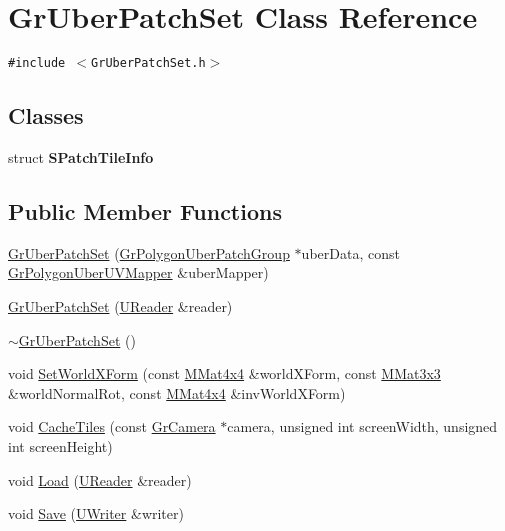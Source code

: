 \hypertarget{class_gr_uber_patch_set}{
\section{GrUberPatchSet Class Reference}
\label{class_gr_uber_patch_set}
}
{\tt \#include $<$GrUberPatchSet.h$>$}

\subsection*{Classes}
\begin{CompactItemize}
\item 
struct \textbf{SPatchTileInfo}
\end{CompactItemize}
\subsection*{Public Member Functions}
\begin{CompactItemize}
\item 
\hyperlink{class_gr_uber_patch_set_68d0f34222103250196fac2f52b8f4d6}{GrUberPatchSet} (\hyperlink{class_gr_polygon_uber_patch_group}{GrPolygonUberPatchGroup} $\ast$uberData, const \hyperlink{class_gr_polygon_uber_u_v_mapper}{GrPolygonUberUVMapper} \&uberMapper)
\item 
\hyperlink{class_gr_uber_patch_set_de170763792a014a4ec60906e5a559cc}{GrUberPatchSet} (\hyperlink{class_u_reader}{UReader} \&reader)
\item 
\hyperlink{class_gr_uber_patch_set_fcdf11f4dd58e87b0db2e0c990ea9eda}{$\sim$GrUberPatchSet} ()
\item 
void \hyperlink{class_gr_uber_patch_set_6feafbdd216ce949255d0e0979b426d4}{SetWorldXForm} (const \hyperlink{class_m_mat4x4}{MMat4x4} \&worldXForm, const \hyperlink{class_m_mat3x3}{MMat3x3} \&worldNormalRot, const \hyperlink{class_m_mat4x4}{MMat4x4} \&invWorldXForm)
\item 
void \hyperlink{class_gr_uber_patch_set_bec24bb077003d70bb235500a3dfb43d}{CacheTiles} (const \hyperlink{class_gr_camera}{GrCamera} $\ast$camera, unsigned int screenWidth, unsigned int screenHeight)
\item 
void \hyperlink{class_gr_uber_patch_set_4ab7aa5b16b09be6984c3b3b9c1307f0}{Load} (\hyperlink{class_u_reader}{UReader} \&reader)
\item 
void \hyperlink{class_gr_uber_patch_set_53a1e10a947e715bd18568b138d53501}{Save} (\hyperlink{class_u_writer}{UWriter} \&writer)
\end{CompactItemize}


